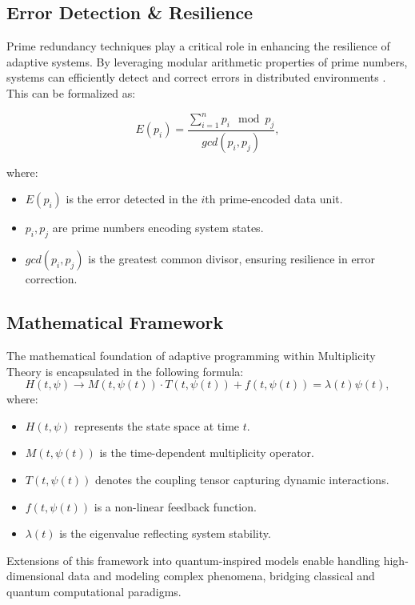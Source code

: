 \documentclass{article}
\theoremstyle{plain}
\begin{document}
\subsection{Error Detection \& Resilience}
Prime redundancy techniques play a critical role in enhancing the resilience of adaptive systems. By leveraging modular arithmetic properties of prime numbers, systems can efficiently detect and correct errors in distributed environments \cite{prime_redundancy_resilience}. This can be formalized as:

\begin{equation}
    E(p_i) = \frac{\sum_{i=1}^{n} p_i \mod p_j}{gcd(p_i, p_j)},
\end{equation}

where:
\begin{itemize}
    \item $E(p_i)$ is the error detected in the $i$th prime-encoded data unit.
    \item $p_i, p_j$ are prime numbers encoding system states.
    \item $gcd(p_i, p_j)$ is the greatest common divisor, ensuring resilience in error correction.
\end{itemize}

\subsection{Mathematical Framework}

The mathematical foundation of adaptive programming within Multiplicity Theory is encapsulated in the following formula:
\begin{equation}
H(t, \psi) \to M(t, \psi(t)) \cdot T(t, \psi(t)) + f(t, \psi(t)) = \lambda(t)\psi(t),
\end{equation}
where:
\begin{itemize}
    \item $H(t, \psi)$ represents the state space at time $t$.
    \item $M(t, \psi(t))$ is the time-dependent multiplicity operator.
    \item $T(t, \psi(t))$ denotes the coupling tensor capturing dynamic interactions.
    \item $f(t, \psi(t))$ is a non-linear feedback function.
    \item $\lambda(t)$ is the eigenvalue reflecting system stability.
\end{itemize}
Extensions of this framework into quantum-inspired models enable handling high-dimensional data and modeling complex phenomena, bridging classical and quantum computational paradigms\cite{preskill2018quantum}.
\end{document}
